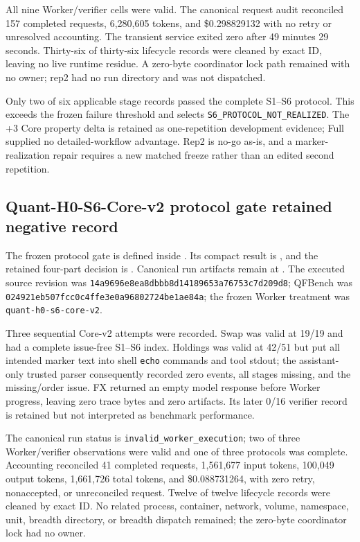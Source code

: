All nine Worker/verifier cells were valid. The canonical request audit
reconciled 157 completed requests, 6,280,605 tokens, and \$0.298829132 with no
retry or unresolved accounting. The transient service exited zero after 49
minutes 29 seconds. Thirty-six of thirty-six lifecycle records were cleaned by
exact ID, leaving no live runtime residue. A zero-byte coordinator lock path
remained with no owner; rep2 had no run directory and was not dispatched.

Only two of six applicable stage records passed the complete S1--S6 protocol.
This exceeds the frozen failure threshold and selects
\texttt{S6\_PROTOCOL\_NOT\_REALIZED}. The +3 Core property delta is retained as
one-repetition development evidence; Full supplied no detailed-workflow
advantage. Rep2 is no-go as-is, and a marker-realization repair requires a new
matched freeze rather than an edited second repetition.

\subsection{Quant-H0-S6-Core-v2 protocol gate retained negative record}

The frozen protocol gate is defined inside
. Its compact
result is
, and the
retained four-part decision is
.
Canonical run artifacts remain at
.
The executed source revision was
\texttt{14a9696e8ea8dbbb8d14189653a76753c7d209d8}; QFBench was
\texttt{024921eb507fcc0c4ffe3e0a96802724be1ae84a}; the frozen Worker treatment was
\texttt{quant-h0-s6-core-v2}.

Three sequential Core-v2 attempts were recorded. Swap was valid at 19/19 and
had a complete issue-free S1--S6 index. Holdings was valid at 42/51 but put all
intended marker text into shell \texttt{echo} commands and tool stdout; the
assistant-only trusted parser consequently recorded zero events, all stages
missing, and the missing/order issue. FX returned an empty model response before
Worker progress, leaving zero trace bytes and zero artifacts. Its later 0/16
verifier record is retained but not interpreted as benchmark performance.

The canonical run status is \texttt{invalid\_worker\_execution}; two of three
Worker/verifier observations were valid and one of three protocols was
complete. Accounting reconciled 41 completed requests, 1,561,677 input tokens,
100,049 output tokens, 1,661,726 total tokens, and \$0.088731264, with zero
retry, nonaccepted, or unreconciled request. Twelve of twelve lifecycle records
were cleaned by exact ID. No related process, container, network, volume,
namespace, unit, breadth directory, or breadth dispatch remained; the zero-byte
coordinator lock had no owner.


